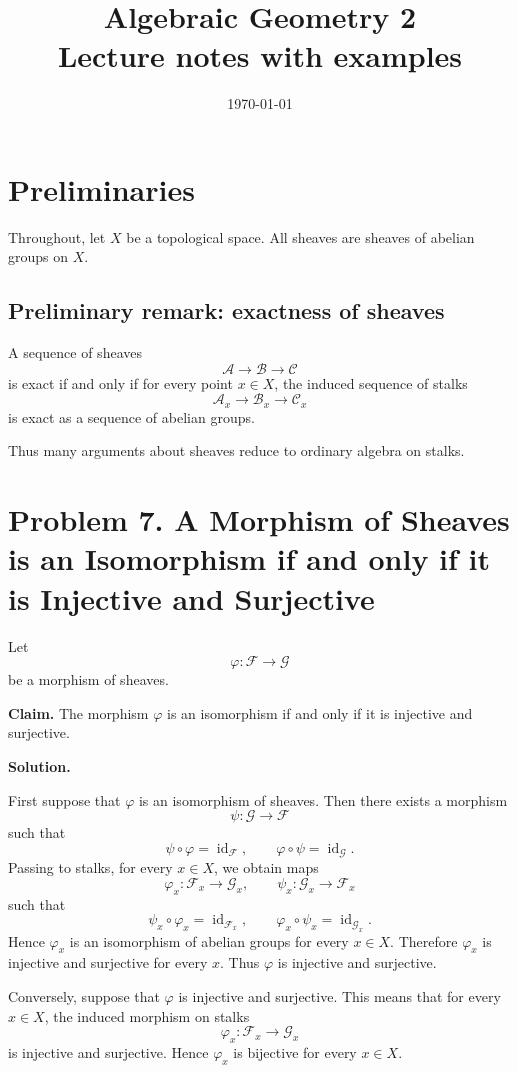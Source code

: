 \documentclass[12pt,a4paper]{article}
\title{\bfseries Algebraic Geometry 2\\


\large Lecture notes with examples}
\author{}
\date{\today}
\DeclareMathOperator{\id}{id}
\newcommand{\F}{\mathcal F}
\newcommand{\G}{\mathcal G}
\theoremstyle{notespace}
\begin{document}
\maketitle
\tableofcontents
\clearpage
\section{Preliminaries}

Throughout, let \(X\) be a topological space. All sheaves are sheaves of abelian groups on \(X\).

\subsection{Preliminary remark: exactness of sheaves}

A sequence of sheaves
\[
\mathcal A \longrightarrow \mathcal B \longrightarrow \mathcal C
\]
is exact if and only if for every point \(x\in X\), the induced sequence of stalks
\[
\mathcal A_x \longrightarrow \mathcal B_x \longrightarrow \mathcal C_x
\]
is exact as a sequence of abelian groups.

Thus many arguments about sheaves reduce to ordinary algebra on stalks.


\section{Problem 7. A Morphism of Sheaves is an Isomorphism if and only if it is Injective and Surjective}

Let
\[
\varphi:\F \longrightarrow \G
\]
be a morphism of sheaves.

\textbf{Claim.} The morphism \(\varphi\) is an isomorphism if and only if it is injective and surjective.

\textbf{Solution.}

First suppose that \(\varphi\) is an isomorphism of sheaves. Then there exists a morphism
\[
\psi:\G\longrightarrow \F
\]
such that
\[
\psi\circ \varphi=\id_{\F},
\qquad
\varphi\circ \psi=\id_{\G}.
\]
Passing to stalks, for every \(x\in X\), we obtain maps
\[
\varphi_x:\F_x\longrightarrow \G_x,
\qquad
\psi_x:\G_x\longrightarrow \F_x
\]
such that
\[
\psi_x\circ \varphi_x=\id_{\F_x},
\qquad
\varphi_x\circ \psi_x=\id_{\G_x}.
\]
Hence \(\varphi_x\) is an isomorphism of abelian groups for every \(x\in X\). Therefore \(\varphi_x\) is injective and surjective for every \(x\). Thus \(\varphi\) is injective and surjective.

Conversely, suppose that \(\varphi\) is injective and surjective. This means that for every \(x\in X\), the induced morphism on stalks
\[
\varphi_x:\F_x\longrightarrow \G_x
\]
is injective and surjective. Hence \(\varphi_x\) is bijective for every \(x\in X\).
\end{document}
